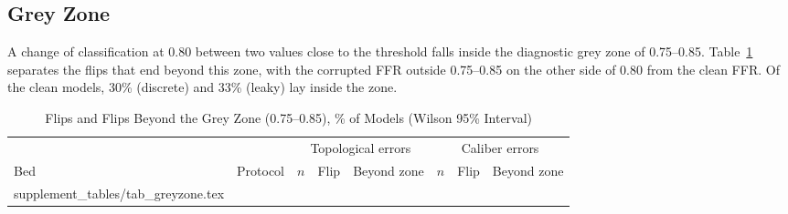 \documentclass[journal,twoside,web,onecolumn]{ieeecolor}
\begin{document}
\FloatBarrier
\subsection{Grey Zone}\label{sec:grey}
A change of classification at 0.80 between two values close to the threshold falls inside the diagnostic grey zone
of 0.75--0.85. Table~\ref{tab:grey} separates the flips that end beyond this zone, with the corrupted FFR outside
0.75--0.85 on the other side of 0.80 from the clean FFR. Of the clean models, 30\% (discrete) and 33\% (leaky) lay
inside the zone.
\begin{table}[!ht]
\caption{Flips and Flips Beyond the Grey Zone (0.75--0.85), \% of Models (Wilson 95\% Interval)}\label{tab:grey}
\centering\footnotesize
\begin{tabular}{@{}llrccrcc@{}}
\toprule
 & & \multicolumn{3}{c}{Topological errors} & \multicolumn{3}{c}{Caliber errors}\\
\cmidrule(lr){3-5}\cmidrule(l){6-8}
Bed & Protocol & $n$ & Flip & Beyond zone & $n$ & Flip & Beyond zone\\
\midrule
{} supplement_tables/tab_greyzone.tex 
\bottomrule
\end{tabular}
\end{table}

\FloatBarrier
\end{document}
